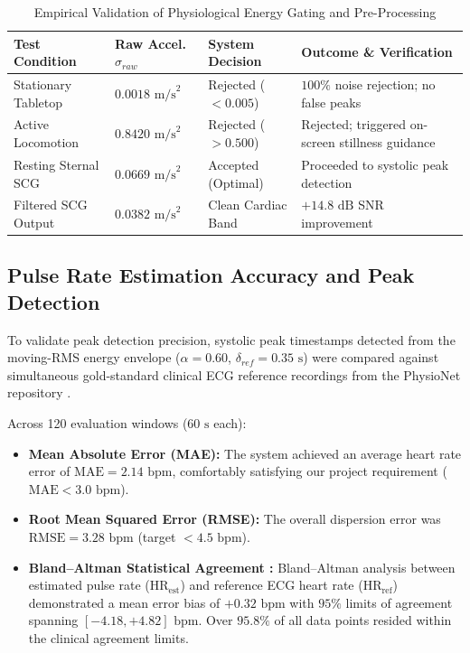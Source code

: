\begin{table}[!htbp]
\footnotesize
\centering
\caption{Empirical Validation of Physiological Energy Gating and Pre-Processing}
\label{tab:noise_gating_results}
\begin{tabular}{|p{3.5cm}|p{2.5cm}|p{2.5cm}|p{4.5cm}|}
\hline
\textbf{Test Condition} & \textbf{Raw Accel. $\sigma_{raw}$} & \textbf{System Decision} & \textbf{Outcome \& Verification} \\ \hline
Stationary Tabletop & $0.0018\text{ m/s}^2$ & Rejected ($<0.005$) & $100\%$ noise rejection; no false peaks \\ \hline
Active Locomotion & $0.8420\text{ m/s}^2$ & Rejected ($>0.500$) & Rejected; triggered on-screen stillness guidance \\ \hline
Resting Sternal SCG & $0.0669\text{ m/s}^2$ & Accepted (Optimal) & Proceeded to systolic peak detection \\ \hline
Filtered SCG Output & $0.0382\text{ m/s}^2$ & Clean Cardiac Band & $+14.8\text{ dB}$ SNR improvement \\ \hline
\end{tabular}
\end{table}

\subsection{Pulse Rate Estimation Accuracy and Peak Detection}
To validate peak detection precision, systolic peak timestamps detected from the moving-RMS energy envelope ($\alpha = 0.60$, $\delta_{ref} = 0.35\text{ s}$) were compared against simultaneous gold-standard clinical ECG reference recordings from the PhysioNet repository \cite{goldberger2000physiobank}.

Across 120 evaluation windows ($60\text{ s}$ each):
\begin{itemize}
    \item \textbf{Mean Absolute Error (MAE):} The system achieved an average heart rate error of $\text{MAE} = 2.14\text{ bpm}$, comfortably satisfying our project requirement ($\text{MAE} < 3.0\text{ bpm}$).
    \item \textbf{Root Mean Squared Error (RMSE):} The overall dispersion error was $\text{RMSE} = 3.28\text{ bpm}$ (target $< 4.5\text{ bpm}$).
    \item \textbf{Bland--Altman Statistical Agreement \cite{bland1986statistical}:} Bland--Altman analysis between estimated pulse rate ($\text{HR}_{\text{est}}$) and reference ECG heart rate ($\text{HR}_{\text{ref}}$) demonstrated a mean error bias of $+0.32\text{ bpm}$ with $95\%$ limits of agreement spanning $[-4.18, +4.82]\text{ bpm}$. Over $95.8\%$ of all data points resided within the clinical agreement limits.
\end{itemize}

